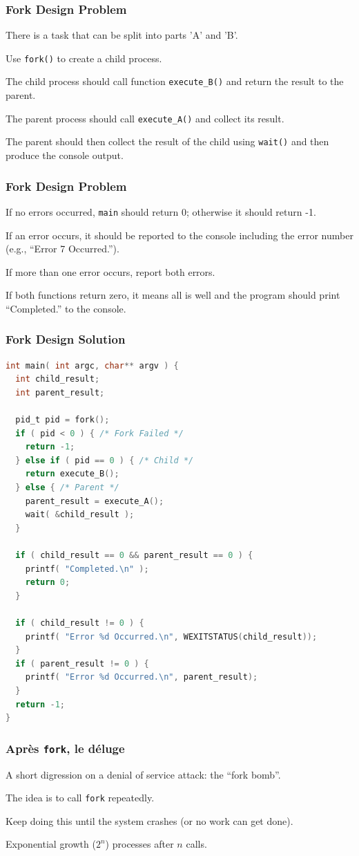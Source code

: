 \begin{frame}
	\frametitle{Fork Design Problem}

	There is a task that can be split into parts 'A' and 'B'.

	Use \texttt{fork()} to create a child process.

	The child process should call function \texttt{execute\_B()} and return the result to the parent.

	The parent process should call \texttt{execute\_A()} and collect its result.

	The parent should then collect the result of the child using \texttt{wait()} and then produce the console output.

\end{frame}

\begin{frame}
	\frametitle{Fork Design Problem}
	If no errors occurred, \texttt{main} should return 0; otherwise it should return -1.

	If an error occurs, it should be reported to the console including the error number (e.g., ``Error 7 Occurred.'').

	If more than one error occurs, report both errors.

	If both functions return zero, it means all is well and the program should print ``Completed.'' to the console.

\end{frame}


\begin{frame}[fragile]
	\frametitle{Fork Design Solution}
	\begin{lstlisting}[language=C]
int main( int argc, char** argv ) {
  int child_result;
  int parent_result;

  pid_t pid = fork();
  if ( pid < 0 ) { /* Fork Failed */
    return -1;
  } else if ( pid == 0 ) { /* Child */
    return execute_B();
  } else { /* Parent */ 
    parent_result = execute_A();
    wait( &child_result );
  }
  
  if ( child_result == 0 && parent_result == 0 ) {
    printf( "Completed.\n" );
    return 0;
  }
  
  if ( child_result != 0 ) {
    printf( "Error %d Occurred.\n", WEXITSTATUS(child_result));
  }
  if ( parent_result != 0 ) {
    printf( "Error %d Occurred.\n", parent_result);
  }
  return -1;
}
\end{lstlisting}
\end{frame}

\begin{frame}
	\frametitle{Apr\`{e}s \texttt{fork}, le d\'{e}luge}

	A short digression on a denial of service attack: the ``fork bomb''.

	The idea is to call \texttt{fork} repeatedly.

	Keep doing this until the system crashes (or no work can get done).

	Exponential growth ($2^n$) processes after $n$ calls.

\end{frame}


